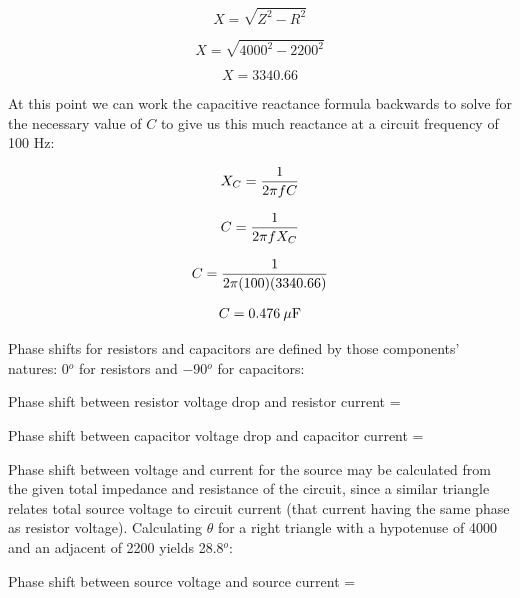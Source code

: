 $$X = \sqrt{Z^2 - R^2}$$

$$X = \sqrt{4000^2 - 2200^2}$$

$$X = 3340.66$$

\vskip 10pt

At this point we can work the capacitive reactance formula backwards to solve for the necessary value of $C$ to give us this much reactance at a circuit frequency of 100 Hz:

$$X_C = {1 \over {2 \pi f C}}$$

$$C = {1 \over {2 \pi f X_C}}$$

$$C = {1 \over {2 \pi (100) (3340.66)}}$$

$$C = 0.476 \> \mu \hbox{F}$$

\vskip 10pt

Phase shifts for resistors and capacitors are defined by those components' natures: 0$^{o}$ for resistors and $-$90$^{o}$ for capacitors:

\vskip 10pt

Phase shift between resistor voltage drop and resistor current = 

\vskip 10pt

Phase shift between capacitor voltage drop and capacitor current = 

\vskip 10pt

Phase shift between voltage and current for the source may be calculated from the given total impedance and resistance of the circuit, since a similar triangle relates total source voltage to circuit current (that current having the same phase as resistor voltage).  Calculating $\theta$ for a right triangle with a hypotenuse of 4000 and an adjacent of 2200 yields 28.8$^{o}$:

\vskip 10pt

Phase shift between source voltage and source current = 





